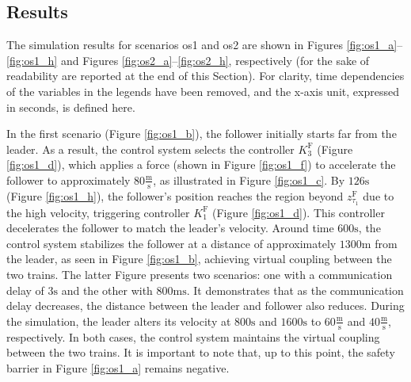 	\subsection{Results}
	\label{sec:results}
	
	The simulation results for scenarios \gls{os}1 and \gls{os}2 are shown in Figures \ref{fig:os1_a}–\ref{fig:os1_h} and Figures \ref{fig:os2_a}–\ref{fig:os2_h}, respectively (for the sake of readability are reported at the end of this Section). For clarity, time dependencies of the variables in the legends have been removed, and the x-axis unit, expressed in seconds, is defined here.
	
	In the first scenario (Figure \ref{fig:os1_b}), the follower initially starts far from the leader. As a result, the control system selects the controller $K_3^\mathrm{F}$ (Figure \ref{fig:os1_d}), which applies a force (shown in Figure \ref{fig:os1_f}) to accelerate the follower to approximately $80 \frac{\unit{\meter}}{\unit{\second}}$, as illustrated in Figure \ref{fig:os1_c}. By $126\unit{\second}$ (Figure \ref{fig:os1_h}), the follower’s position reaches the region beyond $z_{\tau_1}^\mathrm{F}$ due to the high velocity, triggering controller $K_1^\mathrm{F}$ (Figure \ref{fig:os1_d}). This controller decelerates the follower to match the leader's velocity. Around time $600\unit{\second}$, the control system stabilizes the follower at a distance of approximately $1300 \unit{\meter}$ from the leader, as seen in Figure \ref{fig:os1_b}, achieving virtual coupling between the two trains. The latter Figure presents two scenarios: one with a communication delay of $3 \unit{\second}$ and the other with  $800 \unit{\milli\second}$. It demonstrates that as the communication delay decreases, the distance between the leader and follower also reduces. During the simulation, the leader alters its velocity at $800\unit{\second}$ and $1600\unit{\second}$ to $60 \frac{\unit{\meter}}{\unit{\second}}$ and $40 \frac{\unit{\meter}}{\unit{\second}}$, respectively. In both cases, the control system maintains the virtual coupling between the two trains. It is important to note that, up to this point, the safety barrier in Figure \ref{fig:os1_a} remains negative.
	
